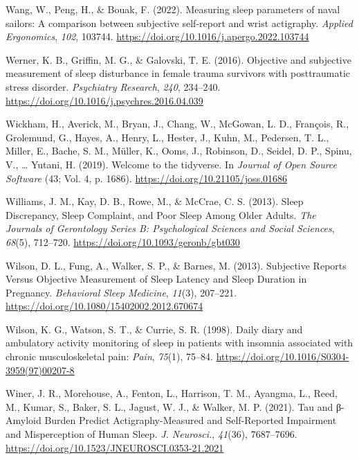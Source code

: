 \documentclass[
]{article}
\newlength{\cslhangindent}
\newenvironment{CSLReferences}[2] %
 {\begin{list}{}{%
  \setlength{\itemindent}{0pt}
  \setlength{\leftmargin}{0pt}
  \setlength{\parsep}{0pt}
  \ifodd #1
   \setlength{\leftmargin}{\cslhangindent}
   \setlength{\itemindent}{-1\cslhangindent}
  \fi
  \setlength{\itemsep}{#2\baselineskip}}}
 {\end{list}}
\begin{document}
\begin{CSLReferences}{1}{0}
Wang, W., Peng, H., \& Bouak, F. (2022). Measuring sleep parameters of naval sailors: {A} comparison between subjective self-report and wrist actigraphy. \emph{Applied Ergonomics}, \emph{102}, 103744. \url{https://doi.org/10.1016/j.apergo.2022.103744}

Werner, K. B., Griffin, M. G., \& Galovski, T. E. (2016). Objective and subjective measurement of sleep disturbance in female trauma survivors with posttraumatic stress disorder. \emph{Psychiatry Research}, \emph{240}, 234--240. \url{https://doi.org/10.1016/j.psychres.2016.04.039}

Wickham, H., Averick, M., Bryan, J., Chang, W., McGowan, L. D., François, R., Grolemund, G., Hayes, A., Henry, L., Hester, J., Kuhn, M., Pedersen, T. L., Miller, E., Bache, S. M., Müller, K., Ooms, J., Robinson, D., Seidel, D. P., Spinu, V., \ldots{} Yutani, H. (2019). Welcome to the {tidyverse}. In \emph{Journal of Open Source Software} (43; Vol. 4, p. 1686). \url{https://doi.org/10.21105/joss.01686}

Williams, J. M., Kay, D. B., Rowe, M., \& McCrae, C. S. (2013). Sleep {Discrepancy}, {Sleep} {Complaint}, and {Poor} {Sleep} {Among} {Older} {Adults}. \emph{The Journals of Gerontology Series B: Psychological Sciences and Social Sciences}, \emph{68}(5), 712--720. \url{https://doi.org/10.1093/geronb/gbt030}

Wilson, D. L., Fung, A., Walker, S. P., \& Barnes, M. (2013). Subjective {Reports} {Versus} {Objective} {Measurement} of {Sleep} {Latency} and {Sleep} {Duration} in {Pregnancy}. \emph{Behavioral Sleep Medicine}, \emph{11}(3), 207--221. \url{https://doi.org/10.1080/15402002.2012.670674}

Wilson, K. G., Watson, S. T., \& Currie, S. R. (1998). Daily diary and ambulatory activity monitoring of sleep in patients with insomnia associated with chronic musculoskeletal pain: \emph{Pain}, \emph{75}(1), 75--84. \url{https://doi.org/10.1016/S0304-3959(97)00207-8}

Winer, J. R., Morehouse, A., Fenton, L., Harrison, T. M., Ayangma, L., Reed, M., Kumar, S., Baker, S. L., Jagust, W. J., \& Walker, M. P. (2021). Tau and β-{Amyloid} {Burden} {Predict} {Actigraphy}-{Measured} and {Self}-{Reported} {Impairment} and {Misperception} of {Human} {Sleep}. \emph{J. Neurosci.}, \emph{41}(36), 7687--7696. \url{https://doi.org/10.1523/JNEUROSCI.0353-21.2021}


\end{CSLReferences}
\end{document}
